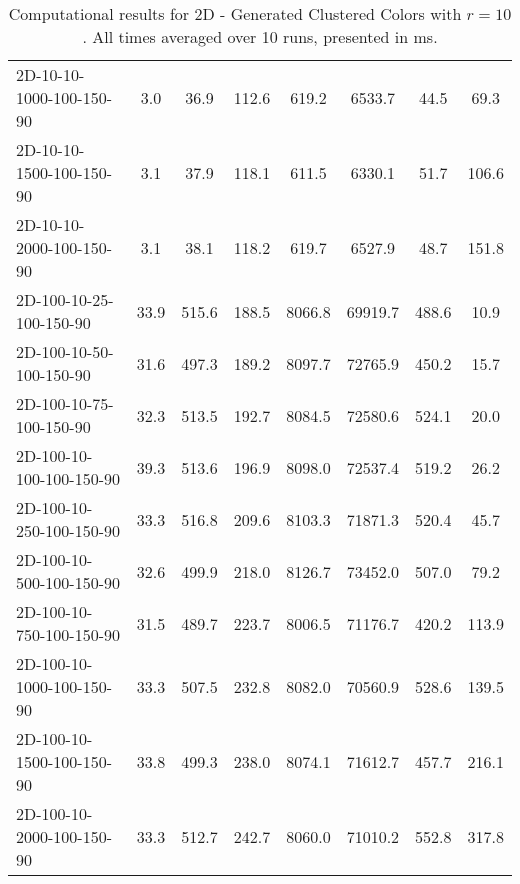 \documentclass{article}
\begin{document}
\begin{center}
\begin{table}[h]
\begin{tabular}{|l||c|c|c|c|c|c|c|}
        2D-10-10-1000-100-150-90 & 3.0 & 36.9 & 112.6 & 619.2 & 6533.7 & 44.5 & 69.3 \\
        2D-10-10-1500-100-150-90 & 3.1 & 37.9 & 118.1 & 611.5 & 6330.1 & 51.7 & 106.6 \\
        2D-10-10-2000-100-150-90 & 3.1 & 38.1 & 118.2 & 619.7 & 6527.9 & 48.7 & 151.8 \\
        \hline
        2D-100-10-25-100-150-90 & 33.9 & 515.6 & 188.5 & 8066.8 & 69919.7 & 488.6 & 10.9 \\
        2D-100-10-50-100-150-90 & 31.6 & 497.3 & 189.2 & 8097.7 & 72765.9 & 450.2 & 15.7 \\
        2D-100-10-75-100-150-90 & 32.3 & 513.5 & 192.7 & 8084.5 & 72580.6 & 524.1 & 20.0 \\
        2D-100-10-100-100-150-90 & 39.3 & 513.6 & 196.9 & 8098.0 & 72537.4 & 519.2 & 26.2 \\
        2D-100-10-250-100-150-90 & 33.3 & 516.8 & 209.6 & 8103.3 & 71871.3 & 520.4 & 45.7 \\
        2D-100-10-500-100-150-90 & 32.6 & 499.9 & 218.0 & 8126.7 & 73452.0 & 507.0 & 79.2 \\
        2D-100-10-750-100-150-90 & 31.5 & 489.7 & 223.7 & 8006.5 & 71176.7 & 420.2 & 113.9 \\
        2D-100-10-1000-100-150-90 & 33.3 & 507.5 & 232.8 & 8082.0 & 70560.9 & 528.6 & 139.5 \\
        2D-100-10-1500-100-150-90 & 33.8 & 499.3 & 238.0 & 8074.1 & 71612.7 & 457.7 & 216.1 \\
        2D-100-10-2000-100-150-90 & 33.3 & 512.7 & 242.7 & 8060.0 & 71010.2 & 552.8 & 317.8 \\
        \hline
        \end{tabular}
        \caption{Computational results for 2D - Generated Clustered Colors with $r=10$. All times averaged over 10 runs, presented in ms.}
    \end{table}
    \end{center}
    
\end{document}
